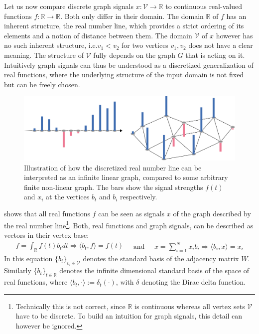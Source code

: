 Let us now compare discrete graph signals $x: \mathcal{V} \to \mathbb{R}$ to continuous real-valued functions $f: \mathbb{R} \to \mathbb{R}$.
Both only differ in their domain.
The domain $\mathbb{R}$ of $f$ has an inherent structure, the real number line, which provides a strict ordering of its elements and a notion of distance between them.
The domain $\mathcal{V}$ of $x$ however has no such inherent structure, i.e.\@ $v_1 < v_2$ for two vertices $v_1, v_2$ does not have a clear meaning.
The structure of $\mathcal{V}$ fully depends on the graph $G$ that is acting on it.
Intuitively graph signals can thus be understood as a discretized generalization of real functions, where the underlying structure of the input domain is not fixed but can be freely chosen.
\begin{figure}
	\centering
	\includegraphics[width=0.9\linewidth]{gfx/sgt/real-graph.pdf}
	\caption{
		Illustration of how the discretized real number line can be interpreted as an infinite linear graph, compared to some arbitrary finite non-linear graph.
		The bars show the signal strengths $f(t)$ and $x_i$ at the vertices $b_t$ and $b_i$ respectively.
	}\label{fig:sgt:realGraph}
\end{figure}
 shows that all real functions $f$ can be seen as signals $x$ of the graph described by the real number line\footnote{%
	Technically this is not correct, since $\mathbb{R}$ is continuous whereas all vertex sets $\mathcal{V}$ have to be discrete.
	To build an intuition for graph signals, this detail can however be ignored.
}.
Both, real functions and graph signals, can be described as vectors in their vertex base:
\begin{equation}
	\begin{split}
		f = \int_{\mathbb{R}} f(t) b_t dt
		\Rightarrow \langle b_t, f \rangle = f(t)
	\end{split}
	\quad\text{and}\quad
	\begin{split}
		x = \sum_{i = 1}^{N} x_i b_i
		\Rightarrow \langle b_i, x \rangle = x_i
	\end{split}
\end{equation}
In this equation ${\{ b_i \}}_{v_i \in \mathcal{V}}$ denotes the standard basis of the adjacency matrix $W$.
Similarly ${\{ b_t \}}_{t \in \mathbb{R}}$ denotes the infinite dimensional standard basis of the space of real functions, where $\langle b_t, \cdot \rangle := \delta_t(\cdot)$, with $\delta$ denoting the Dirac delta function.


